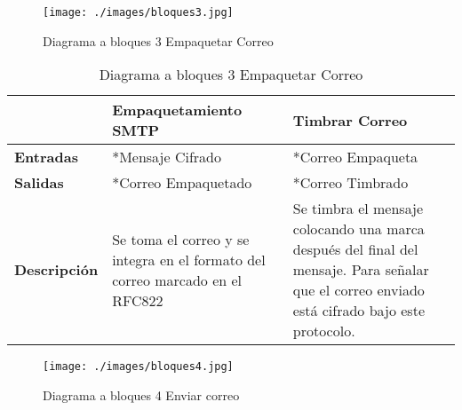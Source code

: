 \documentclass[12pt,oneside,onecolumn,openany]{report}
\begin{document}
\begin{figure}[H]
	\texttt{[image: ./images/bloques3.jpg]}
	\caption{Diagrama a bloques 3 Empaquetar Correo}
	\label{fig:5-3-1}
\end{figure}

\begin{table}[H]
 \centering
   {
     \begin{tabular}{| p{4cm} | p{4cm} | p{4cm} |}
     \hline
     & \textbf{Empaquetamiento SMTP} & \textbf{Timbrar Correo}\\
     \hline
     \textbf{Entradas} & *Mensaje Cifrado & *Correo Empaqueta\\
     \hline
     \textbf{Salidas} & *Correo Empaquetado & *Correo Timbrado\\
     \hline
     \textbf{Descripción} & Se toma el correo y se integra en el formato del correo marcado en el RFC822 & Se timbra el mensaje colocando una marca después del final del mensaje. Para señalar que el correo enviado está cifrado bajo este protocolo.\\

    \end{tabular}
    }
    \caption{Diagrama a bloques 3 Empaquetar Correo}
    \label{tabla:b3}
\end{table}

\begin{figure}[H]
	\texttt{[image: ./images/bloques4.jpg]}
	\caption{Diagrama a bloques 4 Enviar correo}
	\label{fig:5-4-1}
\end{figure}
\end{document}
